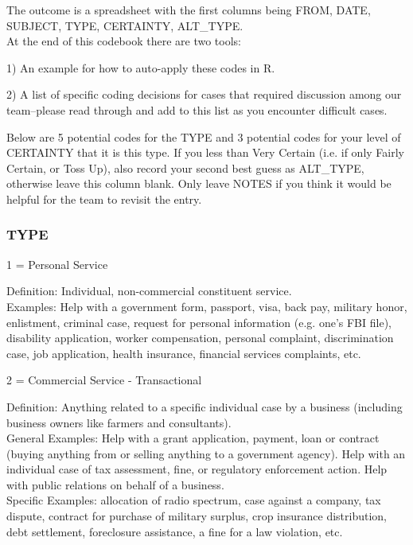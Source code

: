 \documentclass[12pt]{article}
\newenvironment{tight_itemize}{
\begin{itemize}
  \setlength{\itemsep}{0pt}
  \setlength{\parskip}{0pt}
 }{\end{itemize}}
\begin{document}
The outcome is a spreadsheet with the first columns being FROM, DATE, SUBJECT, TYPE, CERTAINTY, ALT\_TYPE.\\

At the end of this codebook there are two tools:
\begin{tight_itemize}
\item[1)] An example for how to auto-apply these codes in R. 
\item[2)] A list of specific coding decisions for cases that required discussion among our team--please read through and add to this list as you encounter difficult cases. 
\end{tight_itemize}

Below are 5 potential codes for the TYPE and 3 potential codes for your level of CERTAINTY that it is this type. If you less than Very Certain (i.e. if only Fairly Certain, or Toss Up), also record your second best guess as ALT\_TYPE, otherwise leave this column blank. Only leave NOTES if you think it would be helpful for the team to revisit the entry.

\subsubsection{TYPE}

1 = Personal Service\\

\hfill\begin{minipage}{\dimexpr\textwidth-2cm}
Definition: Individual, non-commercial constituent service.\\
Examples: Help with a government form, passport, visa, back pay, military honor, enlistment, criminal case, request for personal information (e.g. one’s FBI file), disability application, worker compensation, personal complaint, discrimination case, job application, health insurance, financial services complaints, etc.\\
\end{minipage}

2 = Commercial Service - Transactional \\

\hfill\begin{minipage}{\dimexpr\textwidth-2cm}
Definition: Anything related to a specific individual case by a business (including business owners like farmers and consultants).\\ 
General Examples: Help with a grant application, payment, loan or contract (buying anything from or selling anything to a government agency). Help with an individual case of tax assessment, fine, or regulatory enforcement action. Help with public relations on behalf of a business.\\
Specific Examples: allocation of radio spectrum, case against a company, tax dispute, contract for purchase of military surplus, crop insurance distribution, debt settlement, foreclosure assistance, a fine for a law violation, etc. \\
\end{minipage}
\end{document}
